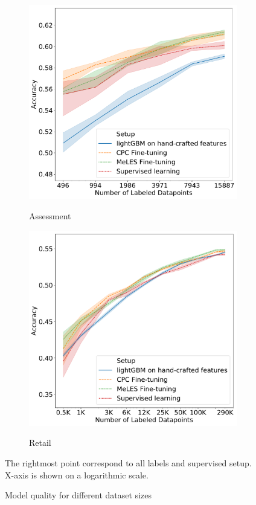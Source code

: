 \documentclass{article}
\begin{document}
\begin{figure}
\begin{subfigure}{0.5\linewidth}
    \label{fig-semi-gender-0}
  \end{subfigure}
  \begin{subfigure}{0.5\linewidth}
    \caption{Assessment}
    \includegraphics[width=\linewidth]{figures/ss_assessment.pdf}
    \label{fig-semi-age-1}
  \end{subfigure}%
  \begin{subfigure}{0.5\linewidth}
    \caption{Retail}
    \includegraphics[width=\linewidth]{figures/ss_x5.pdf}
    \label{fig-semi-gender-1}
  \end{subfigure}
  \caption{Model quality for different dataset sizes} \small{The rightmost point correspond to all labels and supervised setup. X-axis is shown on a logarithmic scale.}
  \label{fig-semi}
\end{figure}
\end{document}
